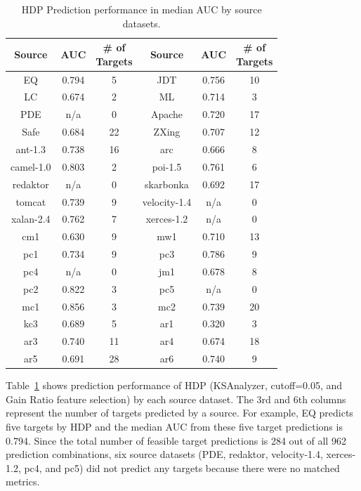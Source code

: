 \begin{table}[!t]
\caption{HDP Prediction performance in median AUC by source datasets.}
\label{tab:by_source}
\begin{tabular}{|c||c|c||c||c|c|}
\hline
\bf{Source}	& \bf{AUC} 	&\specialcell{\bf{\# of}\\\bf{Targets}} &\bf{ Source} & \bf{AUC} 	&\specialcell{\bf{\# of}\\\bf{Targets}} \\ \hline
\hline
EQ	&0.794	&5	&JDT	&0.756	&10	\\ \hline
LC	&0.674	&2	&ML	&0.714	&3	\\ \hline
PDE	&n/a	&0	&Apache	&0.720	&17	\\ \hline
Safe	&0.684	&22	&ZXing	&0.707	&12	\\ \hline
ant-1.3	&0.738	&16	&arc	&0.666	&8	\\ \hline
camel-1.0	&0.803	&2	&poi-1.5	&0.761	&6	\\ \hline
redaktor	&n/a	&0	&skarbonka	&0.692	&17	\\ \hline
tomcat	&0.739	&9	&velocity-1.4	&n/a	&0	\\ \hline
xalan-2.4	&0.762	&7	&xerces-1.2	&n/a	&0	\\ \hline
cm1	&0.630	&9	&mw1	&0.710	&13	\\ \hline
pc1	&0.734	&9	&pc3	&0.786	&9	\\ \hline
pc4	&n/a	&0	&jm1	&0.678	&8	\\ \hline
pc2	&0.822	&3	&pc5	&n/a	&0	\\ \hline
mc1	&0.856	&3	&mc2	&0.739	&20	\\ \hline
kc3	&0.689	&5	&ar1	&0.320	&3	\\ \hline
ar3	&0.740	&11	&ar4	&0.674	&18	\\ \hline
ar5	&0.691	&28	&ar6	&0.740	&9	\\ \hline
\end{tabular}
\end{table}

Table~\ref{tab:by_source} shows prediction performance of HDP (KSAnalyzer, cutoff=0.05, and Gain Ratio feature selection) by each source dataset. The 3rd and 6th columns represent the number of targets predicted by a source. For example, EQ predicts five targets by HDP and the median AUC from these five target predictions is 0.794. Since the total number of feasible target predictions is 284 out of all 962 prediction combinations, six source datasets (PDE, redaktor, velocity-1.4, xerces-1.2, pc4, and pc5) did not predict any targets because there were no matched metrics.


